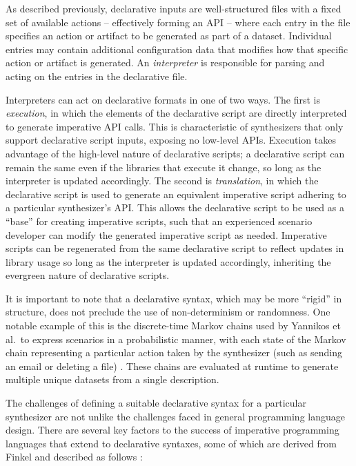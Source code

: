 \documentclass[letterpaper,12pt]{report}
\begin{document}
As described previously, declarative inputs are well-structured files
with a fixed set of available actions -- effectively forming an API --
where each entry in the file specifies an action or artifact to be
generated as part of a dataset. Individual entries may contain
additional configuration data that modifies how that specific action or
artifact is generated. An \emph{interpreter} is responsible for parsing
and acting on the entries in the declarative file.

Interpreters can act on declarative formats in one of two ways. The
first is \emph{execution}, in which the elements of the declarative
script are directly interpreted to generate imperative API calls. This
is characteristic of synthesizers that only support declarative script
inputs, exposing no low-level APIs. Execution takes advantage of the
high-level nature of declarative scripts; a declarative script can
remain the same even if the libraries that execute it change, so long as
the interpreter is updated accordingly. The second is
\emph{translation}, in which the declarative script is used to generate
an equivalent imperative script adhering to a particular synthesizer's
API. This allows the declarative script to be used as a ``base'' for
creating imperative scripts, such that an experienced scenario developer
can modify the generated imperative script as needed. Imperative scripts
can be regenerated from the same declarative script to reflect updates
in library usage so long as the interpreter is updated accordingly,
inheriting the evergreen nature of declarative scripts.

It is important to note that a declarative syntax, which may be more
``rigid'' in structure, does not preclude the use of non-determinism or
randomness. One notable example of this is the discrete-time Markov
chains used by Yannikos et al.~to express scenarios in a probabilistic
manner, with each state of the Markov chain representing a particular
action taken by the synthesizer (such as sending an email or deleting a
file) \cite{yannikosDataCorporaDigital2014}. These chains are
evaluated at runtime to generate multiple unique datasets from a single
description.

The challenges of defining a suitable declarative syntax for a
particular synthesizer are not unlike the challenges faced in general
programming language design. There are several key factors to the
success of imperative programming languages that extend to declarative
syntaxes, some of which are derived from Finkel and described as follows
\cite{finkel1996advanced}:
\end{document}
